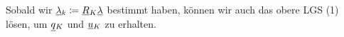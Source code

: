 Sobald wir $ \underline{\lambda}{}_k \coloneqq \underline{R}{}_K \underline{\lambda}{}$ bestimmt haben, können wir auch das obere LGS (1) lösen, um $ \underline{q}{}_K $ und $ \underline{u}{}_K $ zu erhalten.
